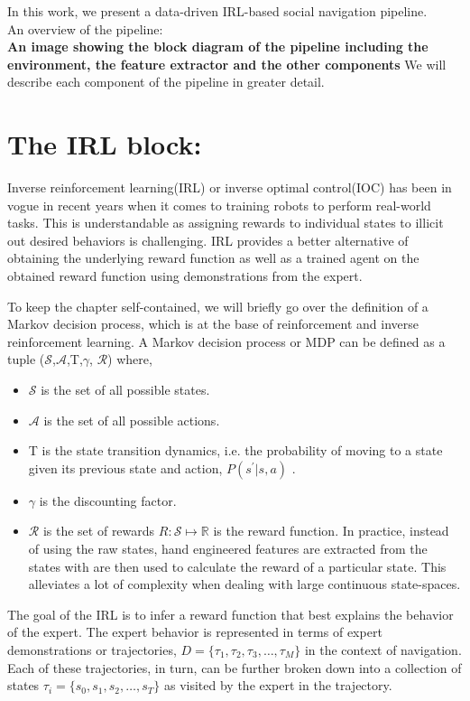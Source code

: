 In this work, we present a data-driven IRL-based social navigation pipeline.\\
An overview of the pipeline:
\\ \textbf{An image showing the block diagram of the pipeline including the environment, the feature extractor and the other components}
We will describe each component of the pipeline in greater detail.
\section*{The IRL block:}
Inverse reinforcement learning(IRL) or inverse optimal control(IOC) has been in vogue in recent years when it comes to training robots to perform real-world tasks. This is understandable as assigning rewards to individual states to illicit out desired behaviors is challenging. IRL provides a better alternative of obtaining the underlying reward function as well as a trained agent on the obtained reward function using demonstrations from the expert.

To keep the chapter self-contained, we will briefly go over the definition of a Markov decision process, which is at the base of reinforcement and inverse reinforcement learning.
A Markov decision process or MDP can be defined as a tuple ($\mathcal{S}$,$\mathcal{A}$,T,$\gamma$, $\mathcal{R}$)  where,
\begin{itemize}
	\item $\mathcal{S}$ is the set of all possible states.
	\item $\mathcal{A}$ is the set of all possible actions.
	\item T is the state transition dynamics, i.e. the probability of moving to a state given its previous state and action, $P(s^{'}|s,a)$ .
	\item $\gamma$ is the discounting factor.
	\item $\mathcal{R}$ is the set of rewards $R:  \mathcal{S} \mapsto \mathbb{R} $ is the reward function. In practice, instead of using the raw states, hand engineered features are extracted from the states with are then used to calculate the reward of a particular state. This alleviates a lot of complexity when dealing with large continuous state-spaces. 
	\end{itemize}  
The goal of the IRL is to infer a reward function that best explains the behavior of the expert. The expert behavior is represented in terms of expert demonstrations or trajectories, $D = \{ \tau_1, \tau_2, \tau_3, \dots, 
\tau_{M} \}$ in the context of navigation. Each of these trajectories, in turn, can be further broken down into a collection of states $\tau_{i} = \{ s_{0}, s_{1}, s_{2}, \dots, s_{T} \}$ as visited by the expert in the trajectory. 

